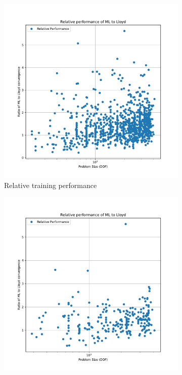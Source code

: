 \documentclass{article}
\begin{document}
\begin{figure}[h]
  \centering
  \begin{subfigure}[t]{0.49\textwidth}
    \centering
    \includegraphics[width=\textwidth]{rel_perf_train.pdf}
    \caption{Relative training performance}
  \end{subfigure}
  \begin{subfigure}[t]{0.49\textwidth}
    \centering
    \includegraphics[width=\textwidth]{rel_perf_test.pdf}

\end{subfigure}
\end{figure}
\end{document}
